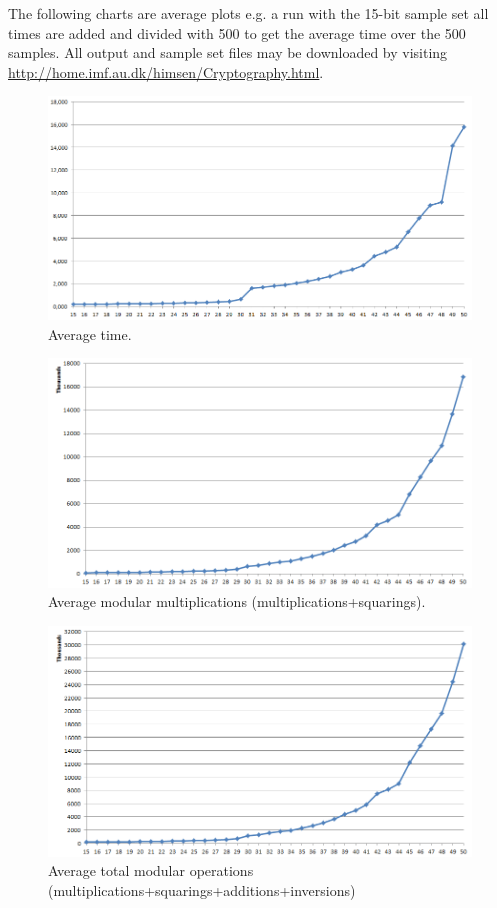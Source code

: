 The following charts are average plots e.g. a run with the 15-bit sample set all times are added and divided with 500 to get the average time over the 500 samples. 
All output and sample set files may be downloaded by visiting \url{http://home.imf.au.dk/himsen/Cryptography.html}.
\begin{figure}[htp]
\centering
\includegraphics[scale=0.6]{stat_time.png}
\caption{Average time.}
\label{fig:dedicatedAddition}
\end{figure}
\begin{figure}[htp]
\centering
\includegraphics[scale=0.6]{stat_mult.png}
\caption{Average modular multiplications (multiplications+squarings).}
\label{fig:dedicatedAddition}
\end{figure}
\begin{figure}[htp]
\centering
\includegraphics[scale=0.6]{stat_TotalMult.png}
\caption{Average total modular operations (multiplications+squarings+additions+inversions)}
\label{fig:dedicatedAddition}
\end{figure}
